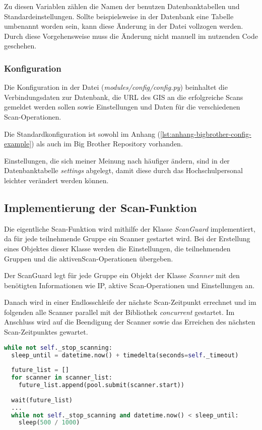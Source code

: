 Zu diesen Variablen zählen die Namen der benutzen Datenbanktabellen und Standardeinstellungen.
Sollte beispielsweise in der Datenbank eine Tabelle umbenannt worden sein, kann diese Änderung in der Datei vollzogen werden. Durch diese Vorgehensweise muss die Änderung nicht manuell im nutzenden Code geschehen.

\subsubsection{Konfiguration}

Die Konfiguration in der Datei (\textit{modules/config/config.py}) beinhaltet die Verbindungsdaten zur Datenbank, die URL des GIS an die erfolgreiche Scans gemeldet werden sollen sowie Einstellungen und Daten für die verschiedenen Scan-Operationen.

Die Standardkonfiguration ist sowohl im Anhang (\autoref{lst:anhang-bigbrother-config-example}) als auch im Big Brother Repository vorhanden.

Einstellungen, die sich meiner Meinung nach häufiger ändern, sind in der Datenbanktabelle \textit{settings} abgelegt, damit diese durch das Hochschulpersonal leichter verändert werden können.

\subsection{Implementierung der Scan-Funktion}

Die eigentliche Scan-Funktion wird mithilfe der Klasse \textit{ScanGuard} implementiert, da für jede teilnehmende Gruppe ein Scanner gestartet wird. Bei der Erstellung eines Objektes dieser Klasse werden die Einstellungen, die teilnehmenden Gruppen und die aktiven\linebreak Scan-Operationen übergeben.

Der ScanGuard legt für jede Gruppe ein Objekt der Klasse \textit{Scanner} mit den benötigten Informationen wie IP, aktive Scan-Operationen und Einstellungen an.

Danach wird in einer Endlosschleife der nächste Scan-Zeitpunkt errechnet und im folgenden alle Scanner parallel mit der Bibliothek \textit{concurrent} gestartet. Im Anschluss wird auf die Beendigung der Scanner sowie das Erreichen des nächsten Scan-Zeitpunktes gewartet.

\begin{lstlisting}[language=Python, frame=single, caption={Big Brother ScanGaurd}, captionpos=b, label={lst:bigbrother-scanguard}]
while not self._stop_scanning:
  sleep_until = datetime.now() + timedelta(seconds=self._timeout)
  
  future_list = []
  for scanner in scanner_list:
    future_list.append(pool.submit(scanner.start))
    
  wait(future_list)
  ...
  while not self._stop_scanning and datetime.now() < sleep_until:
    sleep(500 / 1000)
\end{lstlisting}

